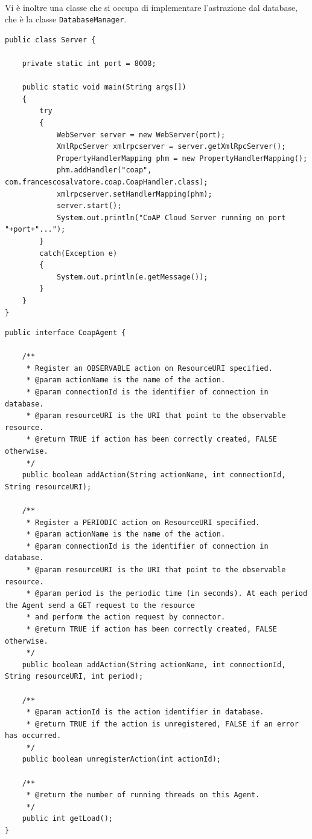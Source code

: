 \\Vi è inoltre una classe che si occupa di implementare l'astrazione dal database, che è la classe {\tt DatabaseManager}.

\lstset{title=La classe Server}
\begin{lstlisting}[float]
public class Server {
	
	private static int port = 8008;
	
	public static void main(String args[])
	{
		try
		{
			WebServer server = new WebServer(port);
			XmlRpcServer xmlrpcserver = server.getXmlRpcServer();
			PropertyHandlerMapping phm = new PropertyHandlerMapping();
			phm.addHandler("coap", com.francescosalvatore.coap.CoapHandler.class);
			xmlrpcserver.setHandlerMapping(phm);
			server.start();
			System.out.println("CoAP Cloud Server running on port "+port+"...");
		}
		catch(Exception e)
		{
			System.out.println(e.getMessage());
		}
	}
}
\end{lstlisting}

\lstset{title=L'interfaccia CoapAgent}
\begin{lstlisting}[float]
public interface CoapAgent {
	
	/**
	 * Register an OBSERVABLE action on ResourceURI specified.
	 * @param actionName is the name of the action.
	 * @param connectionId is the identifier of connection in database.
	 * @param resourceURI is the URI that point to the observable resource.
	 * @return TRUE if action has been correctly created, FALSE otherwise.
	 */
	public boolean addAction(String actionName, int connectionId, String resourceURI);
	
	/**
	 * Register a PERIODIC action on ResourceURI specified.
	 * @param actionName is the name of the action.
	 * @param connectionId is the identifier of connection in database.
	 * @param resourceURI is the URI that point to the observable resource.
	 * @param period is the periodic time (in seconds). At each period the Agent send a GET request to the resource
	 * and perform the action request by connector.
	 * @return TRUE if action has been correctly created, FALSE otherwise.
	 */
	public boolean addAction(String actionName, int connectionId, String resourceURI, int period);
	
	/**
	 * @param actionId is the action identifier in database.
	 * @return TRUE if the action is unregistered, FALSE if an error has occurred.
	 */
	public boolean unregisterAction(int actionId);
	
	/**
	 * @return the number of running threads on this Agent. 
	 */
	public int getLoad();
}
\end{lstlisting}


